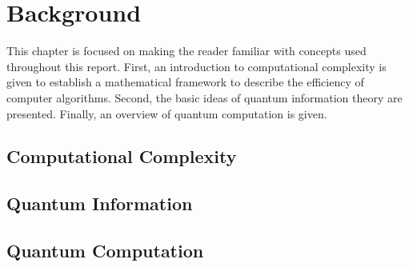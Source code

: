 \chapter{Background} \label{chap:background}
This chapter is focused on making the reader familiar with concepts used throughout this report.
First, an introduction to computational complexity is given to establish a mathematical framework to describe the efficiency of computer algorithms.
Second, the basic ideas of quantum information theory are presented.
Finally, an overview of quantum computation is given.

\section{Computational Complexity}

\section{Quantum Information}

\section{Quantum Computation}